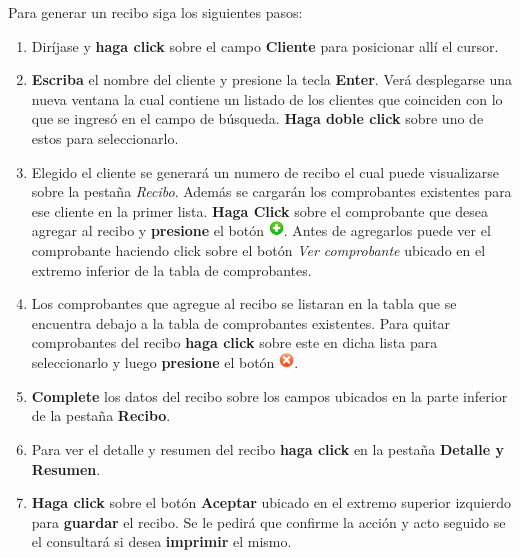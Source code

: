 \documentclass{book}
\begin{document}
Para generar un recibo siga los siguientes pasos:

\begin{enumerate}
	\itemsep=8pt \topsep=0pt \partopsep=0pt \parskip=0pt \parsep=0pt
	
	\item Diríjase y \textbf{haga click} sobre el campo \textbf{Cliente} para posicionar allí el cursor.

	\item \textbf{Escriba} el nombre del cliente y presione la tecla \textbf{Enter}. Verá desplegarse una nueva ventana la cual contiene un listado de los clientes que coinciden con lo que se ingresó en el campo de búsqueda. \textbf{Haga  doble click} sobre uno de estos para seleccionarlo.

	\item Elegido el cliente se generará un numero de recibo el cual puede visualizarse sobre la pestaña \textit{Recibo}. Además se cargarán los comprobantes existentes para ese cliente en la primer lista. \textbf{Haga Click} sobre el comprobante que desea agregar al recibo y \textbf{presione} el botón \includegraphics[width=0.4cm]{images/agregar.png}. Antes de agregarlos puede ver el comprobante haciendo click sobre el botón \textit{Ver comprobante} ubicado en el extremo inferior de la tabla de comprobantes.

	\item Los comprobantes que agregue al recibo se listaran en la tabla que se encuentra debajo a la tabla de comprobantes existentes. Para quitar comprobantes del recibo \textbf{haga click} sobre este en dicha lista para seleccionarlo y luego \textbf{presione} el botón \includegraphics[width=0.4cm]{images/eliminar.png}.

	\item \textbf{Complete} los datos del recibo sobre los campos ubicados en la parte inferior de la pestaña \textbf{Recibo}.

	\item Para ver el detalle y resumen del recibo \textbf{haga click} en la pestaña \textbf{Detalle y Resumen}.

	\item \textbf{Haga click} sobre el botón \textbf{Aceptar} ubicado en el extremo superior izquierdo para \textbf{guardar} el recibo. Se le pedirá que confirme la acción y acto seguido se el consultará si desea \textbf{imprimir} el mismo.

\end{enumerate}
\medskip
\end{document}
